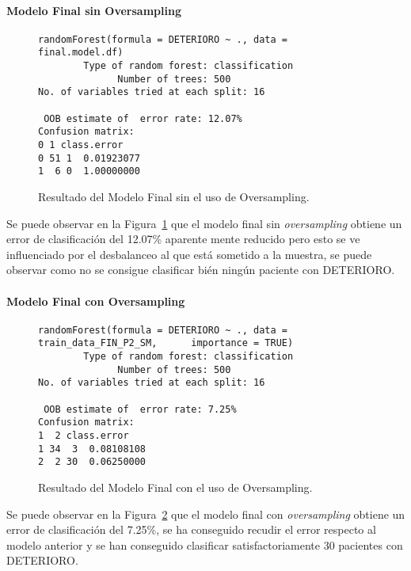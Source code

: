\paragraph{Modelo Final sin Oversampling}

\begin{figure}[H]
    \centering
    \begin{lstlisting}[frame=single, basicstyle=\small\ttfamily]
        randomForest(formula = DETERIORO ~ ., data = final.model.df) 
        Type of random forest: classification
              Number of trees: 500
No. of variables tried at each split: 16

 OOB estimate of  error rate: 12.07%
Confusion matrix:
0 1 class.error
0 51 1  0.01923077
1  6 0  1.00000000
    \end{lstlisting}
    \caption{Resultado del Modelo Final sin el uso de Oversampling.}
    \label{fig:random_forest_FINAL_NO_SMOTE}
\end{figure}

Se puede observar en la Figura~\ref{fig:random_forest_FINAL_NO_SMOTE} que el modelo final sin \textit{oversampling} obtiene un error de clasificación del 12.07\% aparente mente reducido pero esto se ve influenciado por el desbalanceo al que está sometido a la muestra, se puede observar como no se consigue clasificar bién ningún paciente con DETERIORO. 

\paragraph{Modelo Final con Oversampling}

\begin{figure}[H]
    \centering
    \begin{lstlisting}[frame=single, basicstyle=\small\ttfamily]
randomForest(formula = DETERIORO ~ ., data = train_data_FIN_P2_SM,      importance = TRUE) 
        Type of random forest: classification
              Number of trees: 500
No. of variables tried at each split: 16

 OOB estimate of  error rate: 7.25%
Confusion matrix:
1  2 class.error
1 34  3  0.08108108
2  2 30  0.06250000
    \end{lstlisting}
    \caption{Resultado del Modelo Final con el uso de Oversampling.}
    \label{fig:random_forest_FINAL_SMOTE}
\end{figure}

Se puede observar en la Figura~\ref{fig:random_forest_FINAL_SMOTE} que el modelo final con \textit{oversampling} obtiene un error de clasificación del 7.25\%, se ha conseguido recudir el error respecto al modelo anterior y se han conseguido clasificar satisfactoriamente 30 pacientes con DETERIORO.


